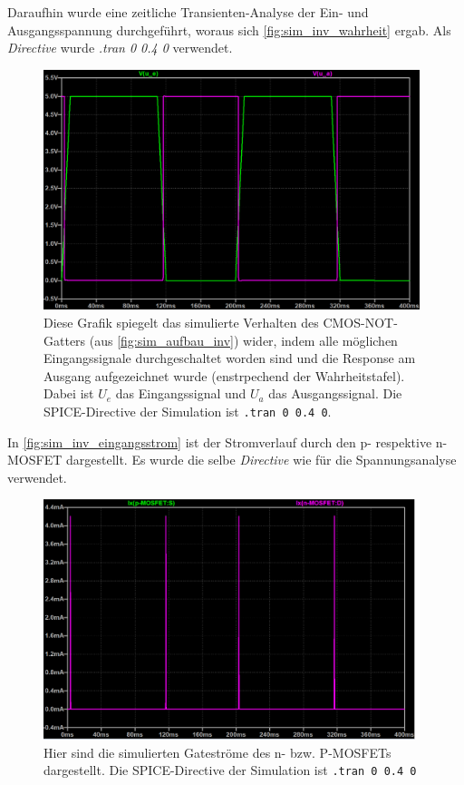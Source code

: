 \documentclass[12pt,english,ngerman]{scrartcl}
\begin{document}
Daraufhin wurde eine zeitliche Transienten-Analyse der Ein- und Ausgangsspannung durchgeführt,
woraus sich \autoref{fig:sim_inv_wahrheit} ergab. Als \textit{Directive} wurde \textit{.tran 0 0.4 0} verwendet.
\begin{figure}[H]
  \centering
  \includegraphics[width=\linewidth, height=7cm]{./simdaten_lab/cmos/inverter/kennlinie_einaus.png}
  \caption{Diese Grafik spiegelt das simulierte Verhalten des CMOS-NOT-Gatters (aus
    \autoref{fig:sim_aufbau_inv}) wider, indem alle möglichen Eingangssignale
    durchgeschaltet worden sind und die Response am Ausgang aufgezeichnet
    wurde (enstrpechend der Wahrheitstafel). Dabei ist
    $U_e$ das Eingangssignal und $U_a$ das Ausgangssignal. Die SPICE-Directive
    der Simulation ist \texttt{.tran 0 0.4 0}.}
  \label{fig:sim_inv_wahrheit}
\end{figure}

In \autoref{fig:sim_inv_eingangsstrom} ist der Stromverlauf durch den p- respektive n-MOSFET
dargestellt. Es wurde die selbe \textit{Directive} wie für die Spannungsanalyse verwendet.

\begin{figure}[H]
  \centering
    \includegraphics[width=\linewidth, height=7cm]{./simdaten_lab/cmos/inverter/strom_correct_beide.png}
    \caption{Hier sind die simulierten Gateströme des n- bzw. P-MOSFETs
    dargestellt. Die SPICE-Directive der Simulation ist \texttt{.tran 0 0.4 0}}
  \label{fig:sim_inv_eingangsstrom}
\end{figure}
\end{document}
